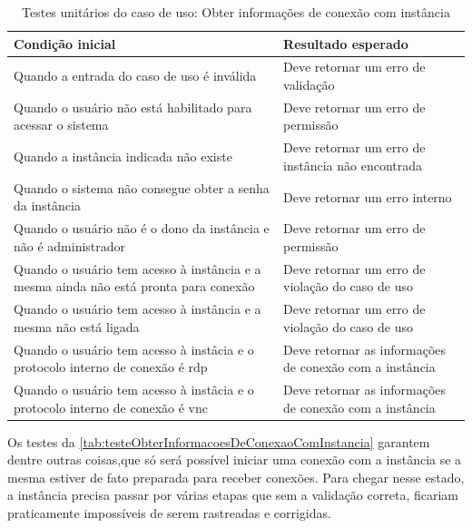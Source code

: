 \begin{table}[h]
\caption{Testes unitários do caso de uso: Obter informações de conexão com instância} 
\label{tab:testeObterInformacoesDeConexaoComInstancia}
\begin{tabularx}{\textwidth}{p{} p{}}
\toprule
\textbf{Condição inicial} & \textbf{Resultado esperado} \\ \midrule

Quando a entrada do caso de uso é inválida & Deve retornar um erro de validação \\ \hline

Quando o usuário não está habilitado para acessar o sistema & Deve retornar um erro de permissão \\ \hline

Quando a instância indicada não existe & Deve retornar um erro de instância não encontrada \\ \hline

Quando o sistema não consegue obter a senha da instância & Deve retornar um erro interno \\ \hline

Quando o usuário não é o dono da instância e não é administrador & Deve retornar um erro de permissão \\ \hline

Quando o usuário tem acesso à instância e a mesma ainda não está pronta para conexão & Deve retornar um erro de violação do caso de uso \\ \hline

Quando o usuário tem acesso à instância e a mesma não está ligada & Deve retornar um erro de violação do caso de uso \\ \hline

Quando o usuário tem acesso à instâcia e o protocolo interno de conexão é \gls{rdp} & Deve retornar as informações de conexão com a instância \\ \hline

Quando o usuário tem acesso à instâcia e o protocolo interno de conexão é \gls{vnc} & Deve retornar as informações de conexão com a instância \\

\bottomrule
\end{tabularx}
\end{table}

Os testes da \autoref{tab:testeObterInformacoesDeConexaoComInstancia} garantem dentre outras coisas,que só será possível iniciar uma conexão com a instância se a mesma estiver de fato preparada para receber conexões. Para chegar nesse estado, a instância precisa passar por várias etapas que sem a validação correta, ficariam praticamente impossíveis de serem rastreadas e corrigidas.


